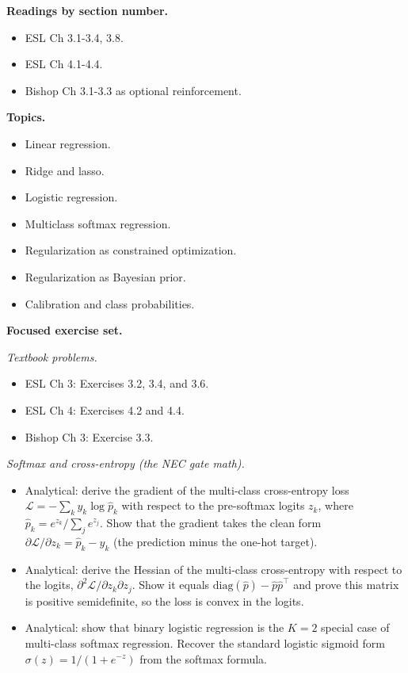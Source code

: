 \textbf{Readings by section number.}

\begin{itemize}
\tightlist
\item
  ESL Ch 3.1-3.4, 3.8.
\item
  ESL Ch 4.1-4.4.
\item
  Bishop Ch 3.1-3.3 as optional reinforcement.
\end{itemize}

\textbf{Topics.}

\begin{itemize}
\tightlist
\item
  Linear regression.
\item
  Ridge and lasso.
\item
  Logistic regression.
\item
  Multiclass softmax regression.
\item
  Regularization as constrained optimization.
\item
  Regularization as Bayesian prior.
\item
  Calibration and class probabilities.
\end{itemize}

\textbf{Focused exercise set.}

\emph{Textbook problems.}

\begin{itemize}
\tightlist
\item
  ESL Ch 3: Exercises 3.2, 3.4, and 3.6.
\item
  ESL Ch 4: Exercises 4.2 and 4.4.
\item
  Bishop Ch 3: Exercise 3.3.
\end{itemize}

\emph{Softmax and cross-entropy (the NEC gate math).}

\begin{itemize}
\tightlist
\item
  Analytical: derive the gradient of the multi-class cross-entropy loss
  \(\mathcal{L} = -\sum_k y_k \log \hat{p}_k\) with respect to the
  pre-softmax logits \(z_k\), where
  \(\hat{p}_k = e^{z_k} / \sum_j e^{z_j}\). Show that the gradient takes
  the clean form
  \(\partial \mathcal{L} / \partial z_k = \hat{p}_k - y_k\) (the
  prediction minus the one-hot target).
\item
  Analytical: derive the Hessian of the multi-class cross-entropy with
  respect to the logits,
  \(\partial^2 \mathcal{L} / \partial z_k \partial z_j\). Show it equals
  \(\text{diag}(\hat{p}) - \hat{p}\hat{p}^\top\) and prove this matrix
  is positive semidefinite, so the loss is convex in the logits.
\item
  Analytical: show that binary logistic regression is the \(K=2\)
  special case of multi-class softmax regression. Recover the standard
  logistic sigmoid form \(\sigma(z) = 1/(1 + e^{-z})\) from the softmax
  formula.
\end{itemize}

